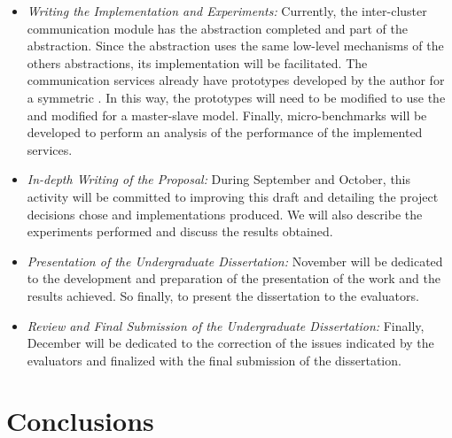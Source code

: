 	\begin{itemize}
		\item \textit{Writing the Implementation and Experiments:}
			Currently, the inter-cluster communication module has the \sync abstraction
			completed and part of the \mailbox abstraction.
			Since the \portal abstraction uses the same low-level mechanisms of the others
			abstractions, its implementation will be facilitated.
			The communication services already have prototypes developed by the author
			for a symmetric \os.
			In this way, the prototypes will need to be modified to use the \hal and
			modified for a master-slave model.
			Finally, micro-benchmarks will be developed to perform an analysis of the
			performance of the implemented services.
		\item \textit{In-depth Writing of the Proposal:}
			During September and October, this activity will be committed to improving
			this draft and detailing the project decisions chose and implementations produced.
			We will also describe the experiments performed and discuss the results obtained.
		\item \textit{Presentation of the Undergraduate Dissertation:}
			November will be dedicated to the development and preparation of the presentation
			of the work and the results achieved.
			So finally, to present the dissertation to the evaluators.
		\item \textit{Review and Final Submission of the Undergraduate Dissertation:}
			Finally, December will be dedicated to the correction of the issues indicated
			by the evaluators and finalized with the final submission of the dissertation.
	\end{itemize}

 \chapter{Conclusions}
\label{ch.conclusions}

